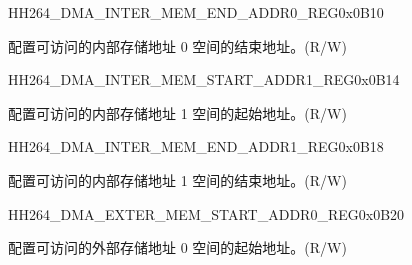     
    \begin{register}{H}{H264\_DMA\_INTER\_MEM\_END\_ADDR0\_REG}{0x0B10}\label{regdesc:H264DMAINTERMEMENDADDR0REG}
    \regnewline%
    \begin{regdesc}\begin{reglist}
    \label{fielddesc:H264DMAACCESSINTERMEMENDADDR0}\item [H264\_DMA\_ACCESS\_INTER\_MEM\_END\_ADDR0] 配置可访问的内部存储地址 0 空间的结束地址。(R/W)
    \end{reglist}\end{regdesc}
    \end{register}
    
    
    \begin{register}{H}{H264\_DMA\_INTER\_MEM\_START\_ADDR1\_REG}{0x0B14}\label{regdesc:H264DMAINTERMEMSTARTADDR1REG}
    \regnewline%
    \begin{regdesc}\begin{reglist}
    \label{fielddesc:H264DMAACCESSINTERMEMSTARTADDR1}\item [H264\_DMA\_ACCESS\_INTER\_MEM\_START\_ADDR1] 配置可访问的内部存储地址 1 空间的起始地址。(R/W)
    \end{reglist}\end{regdesc}
    \end{register}
    
    
    \begin{register}{H}{H264\_DMA\_INTER\_MEM\_END\_ADDR1\_REG}{0x0B18}\label{regdesc:H264DMAINTERMEMENDADDR1REG}
    \regnewline%
    \begin{regdesc}\begin{reglist}
    \label{fielddesc:H264DMAACCESSINTERMEMENDADDR1}\item [H264\_DMA\_ACCESS\_INTER\_MEM\_END\_ADDR1] 配置可访问的内部存储地址 1 空间的结束地址。(R/W)
    \end{reglist}\end{regdesc}
    \end{register}
    
    
    \begin{register}{H}{H264\_DMA\_EXTER\_MEM\_START\_ADDR0\_REG}{0x0B20}\label{regdesc:H264DMAEXTERMEMSTARTADDR0REG}
    \regnewline%
    \begin{regdesc}\begin{reglist}
    \label{fielddesc:H264DMAACCESSEXTERMEMSTARTADDR0}\item [H264\_DMA\_ACCESS\_EXTER\_MEM\_START\_ADDR0] 配置可访问的外部存储地址 0 空间的起始地址。(R/W)
    \end{reglist}\end{regdesc}
    \end{register}
    
